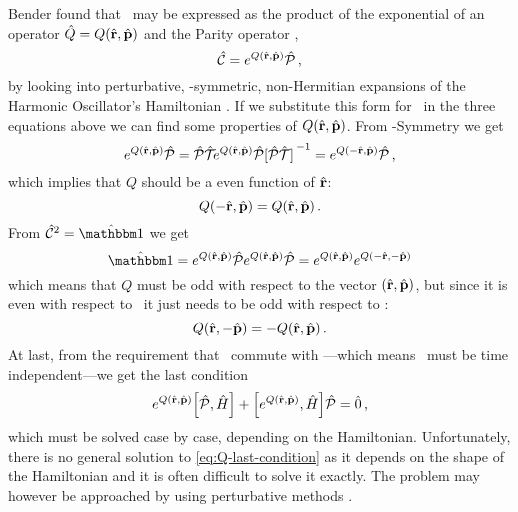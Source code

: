             Bender found that \hC\ may be expressed as the product of the exponential of an operator $\hQ = Q\pqty{\hvr,\hvp}$ and the Parity operator \hP,
            \begin{equation}
                \label{eq:C-exponential}
                \hC = \myexp{Q\pqty{\hvr,\hvp}}\hP
                \mycomma
            \end{equation}
            by looking into perturbative, \PT-symmetric, non-Hermitian expansions of the Harmonic Oscillator's Hamiltonian \cite{bender2024}. If we substitute this form for \hC\ in the three equations above we can find some properties of $Q\pqty{\hvr,\hvp}$. From \PT-Symmetry we get
            \begin{equation*}
                \myexp{Q\pqty{\hvr,\hvp}}\hP
                = \PTtransform{\myexp{Q\pqty{\hvr,\hvp}}\hP}
                = \myexp{Q\pqty{-\hvr,\hvp}}\hP
                \mycomma
            \end{equation*}
            which implies that $Q$ should be a even function of $\hat{\vb{r}}$:
            \begin{equation}
                Q\pqty{-\hvr,\hvp} = Q\pqty{\hvr,\hvp}
                \myperiod
            \end{equation}
            From $\hC^2 = \hidM$ we get
            \begin{equation*}
                \hidM = \myexp{Q\pqty{\hvr,\hvp}} \hP \myexp{Q\pqty{\hvr,\hvp}} \hP = \myexp{Q\pqty{\hvr,\hvp}} \myexp{Q\pqty{-\hvr,-\hvp}}
            \end{equation*}
            which means that $Q$ must be odd with respect to the vector $\pqty{\hvr,\hvp}$, but since it is even with respect to \hvr\ it just needs to be odd with respect to {\hvp}:
            \begin{equation}
                Q\pqty{\hvr,-\hvp} = -Q\pqty{\hvr,\hvp}
                \myperiod
            \end{equation}
            At last, from the requirement that \hC\ commute with \hH---which means \hC\ must be time independent---we get the last condition
            \begin{equation}
                \label{eq:Q-last-condition}
                \myexp{Q\pqty{\hvr,\hvp}} \comm{\hP}{\hH} + \comm{\myexp{Q\pqty{\hvr,\hvp}}}{\hH} \hP = \hzero
                \mycomma
            \end{equation}
            which must be solved case by case, depending on the Hamiltonian. Unfortunately, there is no general solution to \eqref{eq:Q-last-condition} as it depends on the shape of the Hamiltonian and it is often difficult to solve it exactly. The problem may however be approached by using perturbative methods \cite{bender2024}.

